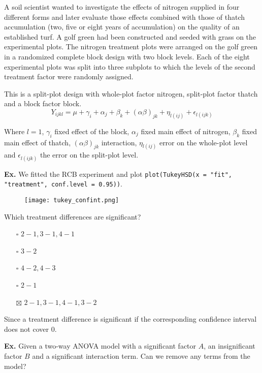 A soil scientist wanted to investigate the effects of nitrogen supplied in four different forms and later evaluate those effects combined with those of thatch accumulation (two, five or eight years of accumulation) on the quality of an established turf. A golf green had been constructed and seeded with grass on the experimental plots. The nitrogen treatment plots were arranged on the golf green in a randomized complete block design with two block levels. Each of the eight experimental plots was split into three subplots to which the levels of the second treatment factor were randomly assigned. \medskip

This is a split-plot design with whole-plot factor nitrogen, split-plot factor thatch and a block factor block.
$$Y_{ijkl} = \mu + \gamma_i + \alpha_j + \beta_k + (\alpha \beta)_{jk} + \eta_{l(ij)} + \epsilon_{l(ijk)}$$

Where $l = 1$, $\gamma_i$ fixed effect of the block, $\alpha_j$ fixed main effect of nitrogen, $\beta_k$ fixed main effect of thatch, $(\alpha \beta)_{jk}$ interaction, $\eta_{l(ij)}$ error on the whole-plot level and $\epsilon_{l(ijk)}$ the error on the split-plot level. \medskip


\hrulefill

\textbf{Ex.} We fitted the RCB experiment and plot \texttt{plot(TukeyHSD(x = "fit", "treatment", conf.level = 0.95))}. \medskip

\begin{wrapfigure}[10]{l}{0.4\linewidth}
    \vspace{-15pt}
    \texttt{[image: tukey\_confint.png]}
\end{wrapfigure}

Which treatment differences are significant?
\begin{itemize}
	\item[$\square$] $2-1, 3 - 1, 4 - 1$
	\item[$\square$] $3-2$
	\item[$\square$] $4-2, 4-3$
	\item[$\square$] $2-1$
	\item[$\boxtimes$] $2-1, 3-1, 4-1, 3-2$
\end{itemize}
Since a treatment difference is significant if the corresponding confidence interval does not cover 0.


\hrulefill

\textbf{Ex.} Given a two-way ANOVA model with a significant factor $A$, an insignificant factor $B$ and a significant interaction term. Can we remove any terms from the model? \medskip

